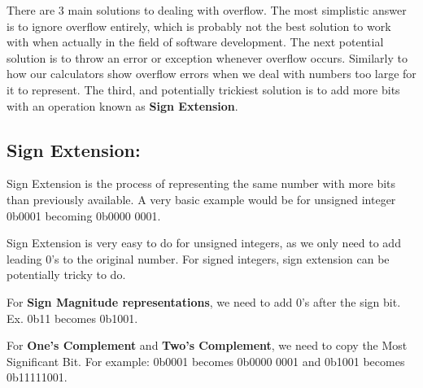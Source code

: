 \documentclass[letterpaper]{article}
\theoremstyle{remark}
\begin{document}
There are 3 main solutions to dealing with overflow. The most simplistic answer is to ignore overflow entirely, which is probably not the best solution to work with when actually in the field of software development. The next potential solution is to throw an error or exception whenever overflow occurs. Similarly to how our calculators show overflow errors when we deal with numbers too large for it to represent. The third, and potentially trickiest solution is to add more bits with an operation known as \textbf{Sign Extension}.

\subsection{Sign Extension:}
Sign Extension is the process of representing the same number with more bits than previously available. A very basic example would be for unsigned integer 0b0001 becoming 0b0000 0001.

Sign Extension is very easy to do for unsigned integers, as we only need to add leading 0's to the original number. For signed integers, sign extension can be potentially tricky to do. 

For \textbf{Sign Magnitude representations}, we need to add 0's after the sign bit. Ex. 0b11 becomes 0b1001.

For \textbf{One's Complement} and \textbf{Two's Complement}, we need to copy the Most Significant Bit. For example: 0b0001 becomes 0b0000 0001 and 0b1001 becomes 0b11111001.
\end{document}
